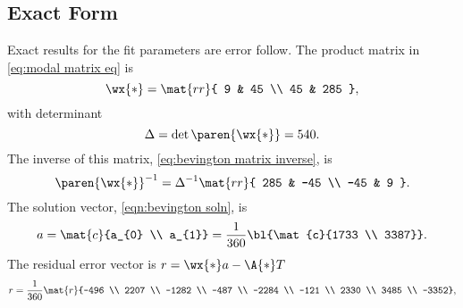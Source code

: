 \subsection{Exact Form}  %
Exact results for the fit parameters are error follow. The product matrix in \eqref{eq:modal matrix eq} is 
  \begin{equation*}   %
    \wx{*} = \mat{rr}{ 9 & 45 \\ 45 & 285 },
  \end{equation*}
with determinant
  \begin{equation*}   %
    \Delta = \det\paren{\wx{*}} = 540.
  \end{equation*}
The inverse of this matrix, \eqref{eq:bevington matrix inverse}, is
  \begin{equation*}   %
    \paren{ \wx{*} }^{-1} = \Delta^{-1} \mat{rr}{ 285 & -45 \\ -45 & 9 }.
  \end{equation*}
The solution vector, \eqref{eqn:bevington soln}, is
  \begin{equation*}   %
      a = \mat{c}{a_{0} \\ a_{1}} = \frac{1}{360} \bl{\mat{c}{1733 \\ 3387}}.
  \end{equation*}
The residual error vector is $r = \wx{*} a - \A{*}T$
  \begin{equation*}
      r = \frac{1}{360}
          \mat{r}{-496 \\ 2207 \\ -1282 \\ -487 \\ -2284 \\ -121 \\ 2330 \\ 3485 \\ -3352},
  \end{equation*}

